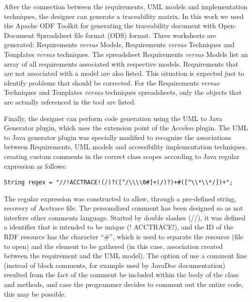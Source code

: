 \documentclass[10pt, conference, compsocconf]{IEEEtran}
\begin{document}
After the connection between the requirements, UML models and implementation techniques, the designer can generate a traceability matrix.
In this work we used the Apache ODF Toolkit for generating the traceability document with Open-Document Spreadsheet file format (ODS) format. Three worksheets are generated: Requirements \textit {versus} Models, Requirements \textit{versus} Techniques and Templates \textit{versus} techniques. The spreadsheet Requirements \textit{versus} Models list an array of all requirements associated with respective models. Requirements that are not associated with a model are also listed. This situation is expected
just to identify problems that should be corrected. For the Requirements \textit{versus} Techniques and Templates \textit{versus} techniques spreadsheets, only the objects that
are actually referenced in the tool are listed.

Finally, the designer can perform code generation using the UML to Java Generator plugin, which uses the extension point of the Acceleo plugin.
The UML to Java generator plugin was specially modified to recognize the associations between Requirements, UML models and accessibility implementation techniques, creating custom comments in the correct class scopes according to Java regular expression as follows:

\medskip

\noindent
\begin{verbatim}
String regex = "//!ACCTRACE!(/)?([^/\\\\0#]+(/)?)+#([^\\*\\*/])+";
\end{verbatim}
%
\noindent

The regular expression was constructed to allow, through a pre-defined string, recovery of Acctrace file. The personalized 
comment has been designed so as not interfere other
comments language. Started by double slashes (//), it was defined a
identifier that is intended to be unique (! ACCTRACE!), and the ID of the RDF resource has the character ``\#'', which is used to separate 
the resource (file to open) and the element to be gathered (in this case,
association created between the requirement and the UML model). The option of
use a comment line (instead of block comments, for example used by JavaDoc documentation) resulted from the fact
of the comment be included within the body of the class and methods, and case
the programmer decides to comment out the entire code, this may be possible. 
\end{document}
